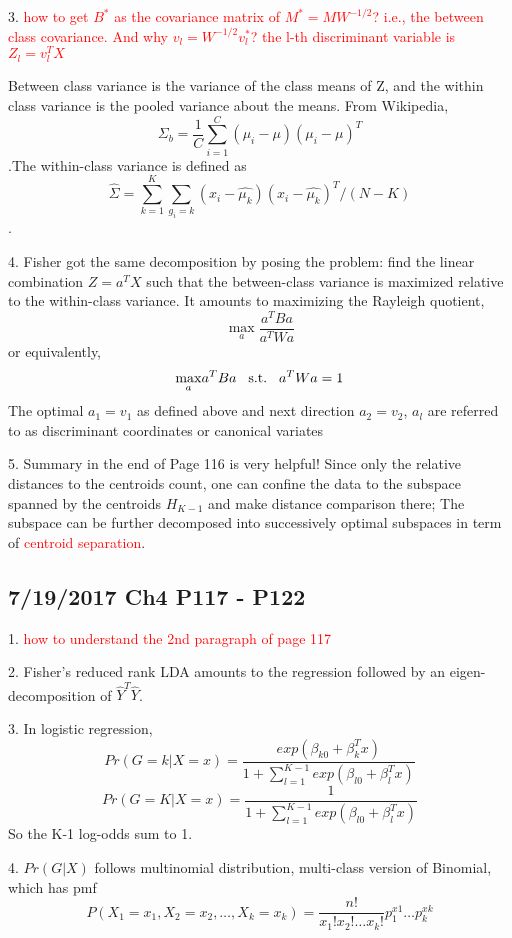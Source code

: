 \documentclass[a4paper, 12pt]{article}
\begin{document}
3. \textcolor{red}{how to get $B^*$ as the covariance matrix of $M^*= MW^{-1/2}$? i.e., the between class covariance. And why $v_l=W^{-1/2}v_l^*$? the l-th discriminant variable is $Z_l=v_l^TX$}

Between class variance is the variance of the class means of Z, and the within class variance is the pooled variance about the means. From Wikipedia, $$\Sigma_b = \frac{1}{C} \sum_{i=1}^C (\mu_i-\mu) (\mu_i-\mu)^T$$.The within-class variance is defined as $$\hat{\Sigma}=\sum_{k=1}^{K}\sum_{g_i=k}(x_i-\hat{\mu_k})(x_i-\hat{\mu_k})^T/(N-K)$$.

4. Fisher got the same decomposition by posing the problem: find the linear combination $Z=a^TX$ such that the between-class variance is maximized relative to the within-class variance. It amounts to maximizing the Rayleigh quotient,
\[ \displaystyle{\max_{a}}\frac{a^TBa}{a^TWa}
\]
or equivalently, 
\[ \displaystyle{\max_{a}}a^TBa \hspace{3mm}\text{s.t.} \hspace{3mm} a^TWa=1
\]
The optimal $a_1=v_1$ as defined above and next direction $a_2=v_2$, $a_l$ are referred to as discriminant coordinates or canonical variates

5. Summary in the end of Page 116 is very helpful! Since only the relative distances to the centroids count, one can confine the data to the subspace spanned by the centroids $H_{K-1}$ and make distance comparison there; The subspace can be further decomposed into successively optimal subspaces in term of \textcolor{red}{centroid separation}.


\subsection*{7/19/2017 Ch4 P117 - P122}

1. \textcolor{red}{how to understand the 2nd paragraph of page 117}

2. Fisher's reduced rank LDA amounts to the regression followed by an eigen-decomposition of $\hat{Y}^T\hat{Y}$.

3. In logistic regression,
$$Pr(G=k|X=x)=\frac{exp(\beta_{k0}+\beta_k^Tx)}{1+\sum_{l=1}^{K-1}exp(\beta_{l0}+\beta_l^Tx)}$$
$$Pr(G=K|X=x)=\frac{1}{1+\sum_{l=1}^{K-1}exp(\beta_{l0}+\beta_l^Tx)}$$
So the K-1 log-odds sum to 1.

4. $Pr(G|X)$ follows multinomial distribution, multi-class version of Binomial,  which has pmf $$P(X_1=x_1,X_2=x_2,\ldots,X_k=x_k)=\frac{n!}{x_1!x_2!\ldots x_k!}p_1^{x1}\ldots p_k^{xk}$$
\end{document}
